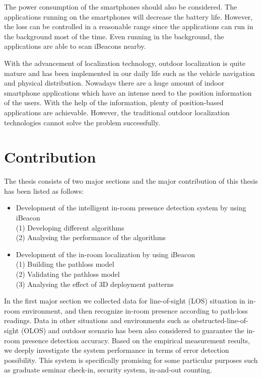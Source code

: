 \documentclass[12pt]{report}
\begin{document}
The power consumption of the smartphones should also be considered. The applications running on the smartphones will decrease the battery life. However, the loss can be controlled in a reasonable range since the applications can run in the background most of the time. Even running in the background, the applications are able to scan iBeacons nearby. 

With the advancement of localization technology, outdoor localization is quite mature and has been implemented in our daily life such as the vehicle navigation and physical distribution. Nowadays there are a huge amount of indoor smartphone applications which have an intense need to the position information of the users. With the help of the information, plenty of position-based applications are achievable. However, the traditional outdoor localization technologies cannot solve the problem successfully. 

\section{Contribution}
The thesis consists of two major sections and the major contribution of this thesis has been listed as follows:

\begin{itemize}
\item Development of the intelligent in-room presence detection system by using iBeacon \\
\hspace{10mm} (1) Developing different algorithms \\
\hspace{10mm} (2) Analysing the performance of the algorithms
\end{itemize}

\begin{itemize}
\item Development of the in-room localization by using iBeacon \\
\hspace{10mm} (1) Building the pathloss model \\
\hspace{10mm} (2) Validating the pathloss model \\
\hspace{10mm} (3) Analysing the effect of 3D deployment patterns 
\end{itemize}

In the first major section we collected data for line-of-sight (LOS) situation in in-room environment, and then recognize in-room presence according to path-loss readings. Data in other situations and environments such as obstructed-line-of-sight (OLOS) and outdoor scenario has been also considered to guarantee the in-room presence detection accuracy. Based on the empirical measurement results, we deeply investigate the system performance in terms of error detection possibility. This system is specifically promising for some particular purposes such as graduate seminar check-in, security system, in-and-out counting.
\end{document}
